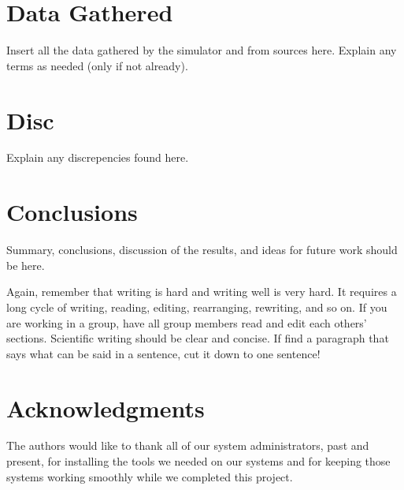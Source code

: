 \documentclass[12pt]{article}
\newcommand{\singlespace}{
  \protect\renewcommand\baselinestretch{1.0}
  \protect\normalsize
}
\begin{document}
\section{Data Gathered}
\label{sec:data}

Insert all the data gathered by the simulator and from sources here.
Explain any terms as needed (only if not already). 

\section{Disc}
\label{sec:disc}

Explain any discrepencies found here.

\section{Conclusions}
\label{sec:conclusions}

Summary, conclusions, discussion of the results, and ideas for future
work should be here.

Again, remember that writing is hard and writing well is very hard.  It
requires a long cycle of writing, reading, editing, rearranging,
rewriting, and so on.  If you are working in a group, have all group
members read and edit each others' sections.  Scientific writing
should be clear and concise.  If find a paragraph that says what can
be said in a sentence, cut it down to one sentence!

\section*{Acknowledgments}

The authors would like to thank all of our system administrators, past
and present, for installing the tools we needed on our systems and for
keeping those systems working smoothly while we completed this
project.

%
% 
\singlespace



\end{document}
